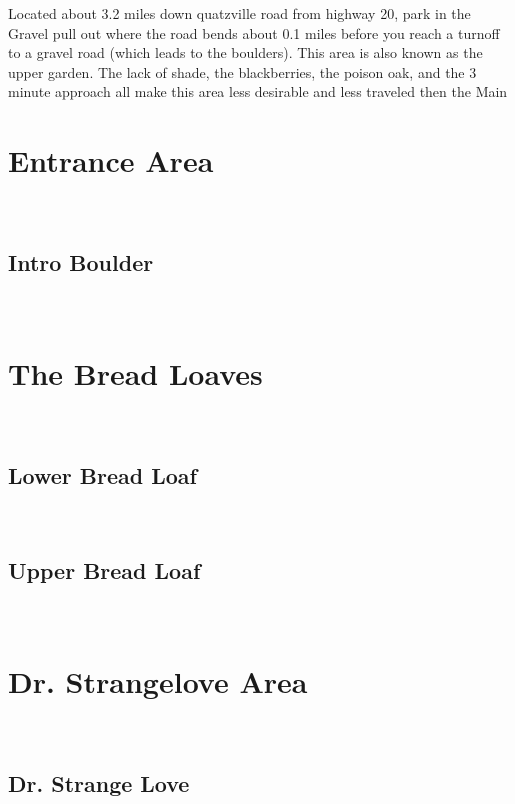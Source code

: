 \begin{multicols}{2}
Located about 3.2 miles down quatzville road from highway 20, park in the Gravel pull out where the road bends about 0.1 miles before you reach a turnoff to a gravel road (which leads to the boulders). This area is also known as the upper garden. The lack of shade, the blackberries, the poison oak, and the 3 minute approach all make this area less desirable and less traveled then the Main

		\section{Entrance Area}\label{sa:Entrance Area}
	\
			\subsection*{Intro Boulder}\label{bf:Intro Boulder}
			\
			
		\section{The Bread Loaves}\label{sa:The Bread Loaves}
	\
			\subsection*{Lower Bread Loaf}\label{bf:Lower Bread Loaf}
			\
			
			\subsection*{Upper Bread Loaf}\label{bf:Upper Bread Loaf}
			\
			
		\section{Dr. Strangelove Area}\label{sa:Dr. Strangelove Area}
	\
			\subsection*{Dr. Strange Love}\label{bf:Dr. Strange Love}
			\
			
\end{multicols}
\clearpage